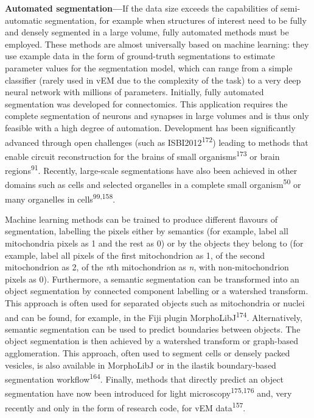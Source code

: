 \documentclass{article}
\begin{document}
\textbf{Automated segmentation—}If the data size exceeds the capabilities of semi-automatic segmentation, for example when structures of interest need to be fully and densely segmented in a large volume, fully automated methods must be employed. These methods are almost universally based on machine learning: they use example data in the form of ground-truth segmentations to estimate parameter values for the segmentation model, which can range from a simple classifier (rarely used in vEM due to the complexity of the task) to a very deep neural network with millions of parameters. Initially, fully automated segmentation was developed for connectomics. This application requires the complete segmentation of neurons and synapses in large volumes and is thus only feasible with a high degree of automation. Development has been significantly advanced through open challenges (such as ISBI2012\textsuperscript{172}) leading to methods that enable circuit reconstruction for the brains of small organisms\textsuperscript{173} or brain regions\textsuperscript{91}. Recently, large-scale segmentations have also been achieved in other domains such as cells and selected organelles in a complete small organism\textsuperscript{50} or many organelles in cells\textsuperscript{99,158}.

Machine learning methods can be trained to produce different flavours of segmentation, labelling the pixels either by semantics (for example, label all mitochondria pixels as 1 and the rest as 0) or by the objects they belong to (for example, label all pixels of the first mitochondrion as 1, of the second mitochondrion as 2, of the \emph{n}th mitochondrion as \emph{n}, with non-mitochondrion pixels as 0). Furthermore, a semantic segmentation can be transformed into an object segmentation by connected component labelling or a watershed transform. This approach is often used for separated objects such as mitochondria or nuclei and can be found, for example, in the Fiji plugin MorphoLibJ\textsuperscript{174}. Alternatively, semantic segmentation can be used to predict boundaries between objects. The object segmentation is then achieved by a watershed transform or graph-based agglomeration. This approach, often used to segment cells or densely packed vesicles, is also available in MorphoLibJ or in the ilastik boundary-based segmentation workflow\textsuperscript{164}. Finally, methods that directly predict an object segmentation have now been introduced for light microscopy\textsuperscript{175,176} and, very recently and only in the form of research code, for vEM data\textsuperscript{157}.
\end{document}
